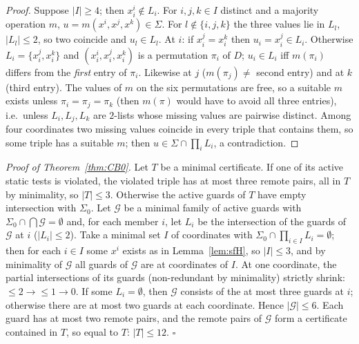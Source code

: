 \begin{proof}
Suppose $|I|\ge4$; then $x^i_i\notin L_i$. For $i,j,k\in I$ distinct and a majority operation $m$, $u=m(x^i,x^j,x^k)\in\Sigma$. For $l\notin\{i,j,k\}$ the three values lie in $L_l$, $|L_l|\le2$, so two coincide and $u_l\in L_l$. At $i$: if $x^j_i=x^k_i$ then $u_i=x^j_i\in L_i$. Otherwise $L_i=\{x^j_i,x^k_i\}$ and $(x^i_i,x^j_i,x^k_i)$ is a permutation $\pi_i$ of $D$; $u_i\in L_i$ iff $m(\pi_i)$ differs from the \emph{first} entry of $\pi_i$. Likewise at $j$ ($m(\pi_j)\ne$ second entry) and at $k$ (third entry). The values of $m$ on the six permutations are free, so a suitable $m$ exists unless $\pi_i=\pi_j=\pi_k$ (then $m(\pi)$ would have to avoid all three entries), i.e.\ unless $L_i,L_j,L_k$ are $2$-lists whose missing values are pairwise distinct. Among four coordinates two missing values coincide in every triple that contains them, so some triple has a suitable $m$; then $u\in\Sigma\cap\prod_iL_i$, a contradiction.
\end{proof}
\emph{Proof of Theorem~\ref{thm:CB0}.} Let $T$ be a minimal certificate. If one of its active static tests is violated, the violated triple has at most three remote pairs, all in $T$ by minimality, so $|T|\le3$. Otherwise the active guards of $T$ have empty intersection with $\Sigma_0$. Let $\mathcal G$ be a minimal family of active guards with $\Sigma_0\cap\bigcap\mathcal G=\emptyset$ and, for each member $i$, let $L_i$ be the intersection of the guards of $\mathcal G$ at $i$ ($|L_i|\le2$). Take a minimal set $I$ of coordinates with $\Sigma_0\cap\prod_{i\in I}L_i=\emptyset$; then for each $i\in I$ some $x^i$ exists as in Lemma~\ref{lem:sfH}, so $|I|\le3$, and by minimality of $\mathcal G$ all guards of $\mathcal G$ are at coordinates of $I$. At one coordinate, the partial intersections of its guards (non-redundant by minimality) strictly shrink: $\le2\to\le1\to0$. If some $L_i=\emptyset$, then $\mathcal G$ consists of the at most three guards at $i$; otherwise there are at most two guards at each coordinate. Hence $|\mathcal G|\le6$. Each guard has at most two remote pairs, and the remote pairs of $\mathcal G$ form a certificate contained in $T$, so equal to $T$: $|T|\le12$. \hfill$\square$

